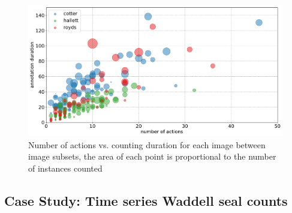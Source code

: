 \begin{figure}[ht]
\centering
\includegraphics[width=1.0\linewidth]{charts/aerial_penguins/actions_time_a.pdf}
\caption{ Number of actions vs. counting duration for each image between image subsets, the area of each point is proportional to the number of instances counted }
\label{fig:actions_time_penguins}
\end{figure}


\subsection{Case Study: Time series Waddell seal counts}
\label{sec:case_seals}


